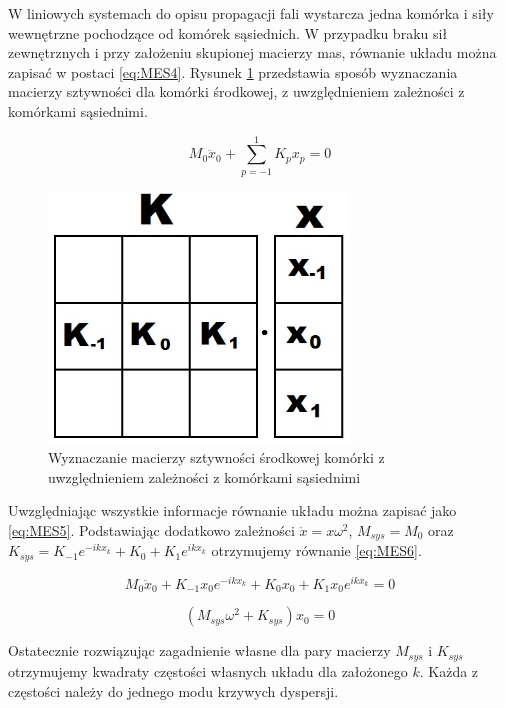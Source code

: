 W liniowych systemach do opisu propagacji fali wystarcza jedna komórka i siły wewnętrzne pochodzące od komórek sąsiednich. W przypadku braku sił zewnętrznych i przy założeniu skupionej macierzy mas, równanie układu można zapisać w postaci \ref{eq:MES4}. Rysunek \ref{fig:komorki_preta_sztywnosc} przedstawia sposób wyznaczania macierzy sztywności dla komórki środkowej, z uwzględnieniem zależności z komórkami sąsiednimi.

\begin{equation} \label{eq:MES4}
M_0\ddot x_0 + \sum_{p=-1}^1 K_p x_p = 0
\end{equation}

\begin{figure}[h]
\centering
\includegraphics[width=8cm]{Zdjecia/2/metoda_numeryczna3_sztywnosc}
\caption{Wyznaczanie macierzy sztywności środkowej komórki z uwzględnieniem zależności z komórkami sąsiednimi}
\label{fig:komorki_preta_sztywnosc}
\end{figure}

Uwzględniając wszystkie informacje równanie układu można zapisać jako \ref{eq:MES5}. Podstawiając dodatkowo zależności \( \ddot x = x \omega^2 \), \( M_{sys} = M_0 \) oraz \( K_{sys} = K_{-1} e^{-ikx_k} + K_0 + K_1 e^{ikx_k} \) otrzymujemy równanie \ref{eq:MES6}.

\begin{equation} \label{eq:MES5}
M_0\ddot x_0 + K_{-1} x_0 e^{-ikx_k} + K_0 x_0 + K_1 x_0 e^{ikx_k} = 0
\end{equation}

\begin{equation} \label{eq:MES6}
 (M_{sys}\omega^2 + K_{sys})x_0 = 0
\end{equation}

Ostatecznie rozwiązując zagadnienie własne dla pary macierzy \( M_{sys} \) i \( K_{sys} \) otrzymujemy kwadraty częstości własnych układu dla założonego \( k \). Każda z częstości należy do jednego modu krzywych dyspersji.

